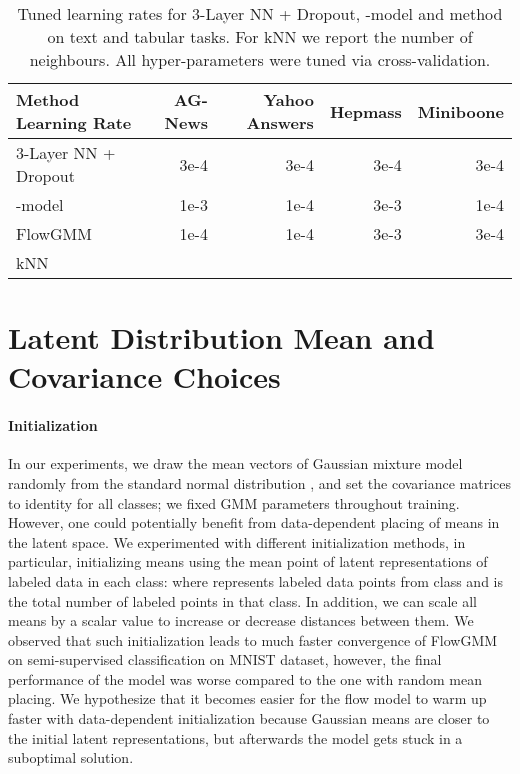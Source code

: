 \documentclass{article}
\newcommand{\method}{FlowGMM\xspace}
\begin{document}
\begin{table*}[t]
	\centering
	\caption{
	Tuned learning rates for 3-Layer NN + Dropout, -model and method on text and tabular tasks. 
	For kNN we report the number of neighbours. 
	All hyper-parameters were tuned via cross-validation.
	}
	\label{tab:ssl_learning_rates}
    \centering
    \small
	\begin{tabular}{lrrrr}
		Method Learning Rate      & AG-News  
                                  & Yahoo Answers
                                  & Hepmass 
                                  & Miniboone\\
       \midrule
        3-Layer NN + Dropout & 3e-4 & 3e-4 & 3e-4 & 3e-4 \\
        -model & 1e-3 & 1e-4 & 3e-3 & 1e-4 \\
        \method & 1e-4 & 1e-4 & 3e-3 & 3e-4 \\
        \midrule
        kNN &  &  &  &  \\
        
        
	\end{tabular}
\end{table*}


\section{Latent Distribution Mean and Covariance Choices}\label{sec:meanchoice}

\paragraph{Initialization} In our experiments, we draw the mean vectors  of Gaussian mixture model randomly from the standard normal distribution , and set the covariance matrices to identity  for all classes; we fixed GMM parameters throughout training.
However, one could potentially benefit from data-dependent placing of means in the latent space. We experimented with different initialization methods, in particular, initializing means using the mean point of latent representations of labeled data in each class:  where  represents labeled data points from class  and  is the total number of labeled points in that class. In addition, we can scale all means by a scalar value  to increase or decrease distances between them. We observed that such initialization leads to much faster convergence of FlowGMM on semi-supervised classification on MNIST dataset, however, the final performance of the model was worse compared to the one with random mean placing. We hypothesize that it becomes easier for the flow model to warm up faster with data-dependent initialization because Gaussian means are closer to the initial latent representations, but afterwards the model gets stuck in a suboptimal solution. 
\end{document}
